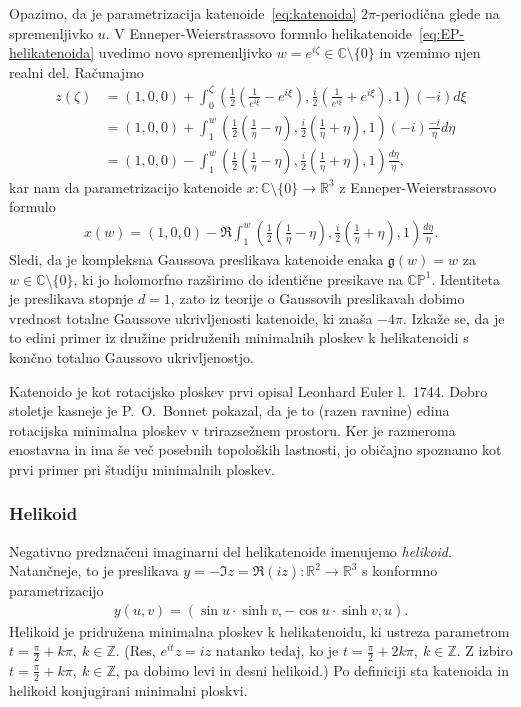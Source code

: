 \documentclass[12pt,a4paper,twoside]{article}
\theoremstyle{definition} %
\theoremstyle{plain} %
\numberwithin{equation}{section}  %
\begin{document}
Opazimo, da je parametrizacija katenoide~\ref{eq:katenoida} $2 \pi$-periodična glede na spremenljivko $u$. V Enneper-Weierstrassovo formulo helikatenoide~\ref{eq:EP-helikatenoida} uvedimo novo spremenljivko $w = e^{i \zeta} \in \mathbb{C} \setminus \{0\}$ in vzemimo njen realni del. Računajmo
\begin{align*}
z(\zeta) &= (1,0,0) + \int_{0}^{\zeta} \left( \frac{1}{2} \left(\frac{1}{e^{i\xi}} - e^{i\xi} \right), \frac{i}{2} \left(\frac{1}{e^{i\xi}} + e^{i\xi} \right), 1 \right) (-i) d\xi \\
	&= (1,0,0) + \int_{1}^{w} \left( \frac{1}{2} \left(\frac{1}{\eta} - \eta \right), \frac{i}{2} \left(\frac{1}{\eta} + \eta \right), 1 \right) (-i) \frac{-i}{\eta} d\eta \\
	&= (1,0,0) - \int_{1}^{w} \left( \frac{1}{2} \left(\frac{1}{\eta} - \eta \right), \frac{i}{2} \left(\frac{1}{\eta} + \eta \right), 1 \right) \frac{d\eta}{\eta},
\end{align*}
kar nam da parametrizacijo katenoide $x \colon \mathbb{C} \setminus \{0\} \to \mathbb{R}^3$ z Enneper-Weierstrassovo formulo
\begin{align}
x(w) = (1,0,0) - \Re \int_{1}^{w} \left( \frac{1}{2} \left(\frac{1}{\eta} - \eta \right), \frac{i}{2} \left(\frac{1}{\eta} + \eta \right), 1 \right) \frac{d\eta}{\eta}.
\end{align}
Sledi, da je kompleksna Gaussova preslikava katenoide enaka $\mathfrak{g}(w) = w$ za $w \in \mathbb{C} \setminus \{0\}$, ki jo holomorfno razširimo do identične presikave na $\mathbb{CP}^{1}$. Identiteta je preslikava stopnje $d=1$, zato iz teorije o Gaussovih preslikavah dobimo vrednost totalne Gaussove ukrivljenosti katenoide, ki znaša $-4 \pi$. Izkaže se, da je to edini primer iz družine pridruženih minimalnih ploskev k helikatenoidi s končno totalno Gaussovo ukrivljenostjo.

Katenoido je kot rotacijsko ploskev prvi opisal Leonhard Euler l.~1744. Dobro stoletje kasneje je P.~O.~Bonnet pokazal, da je to (razen ravnine) edina rotacijska minimalna ploskev v trirazsežnem prostoru. Ker je razmeroma enostavna in ima še več posebnih topoloških lastnosti, jo običajno spoznamo kot prvi primer pri študiju minimalnih ploskev.

\subsubsection{Helikoid}
%
Negativno predznačeni imaginarni del helikatenoide imenujemo \emph{helikoid}. Natančneje, to je preslikava $y = -\Im z = \Re (iz) \colon \mathbb{R}^2 \to \mathbb{R}^3$ s konformno parametrizacijo
\begin{align} \label{eq:helikoid}
y(u,v) = (\sin u \cdot \sinh v, -\cos u \cdot \sinh v, u).
\end{align}
Helikoid je pridružena minimalna ploskev k helikatenoidu, ki ustreza parametrom $t = \frac{\pi}{2} + k \pi, \ k \in \mathbb{Z}$. (Res, $e^{it}z = iz$ natanko tedaj, ko je $t = \frac{\pi}{2} + 2k \pi, \ k \in \mathbb{Z}$. Z izbiro $t = \frac{\pi}{2} + k \pi, \ k \in \mathbb{Z}$, pa dobimo levi in desni helikoid.) Po definiciji sta katenoida in helikoid konjugirani minimalni ploskvi.
\end{document}
